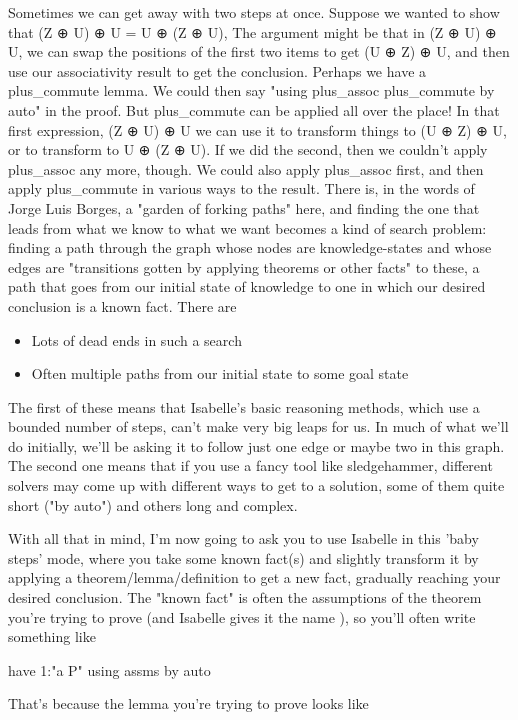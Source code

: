 Sometimes we can get away with two steps at once. Suppose we wanted to show that (Z ⊕ U) ⊕ U = U ⊕  (Z ⊕ U), The argument might be that in (Z ⊕ U) ⊕ U, we can swap the positions of the first two items to get (U ⊕ Z) ⊕ U, and then use our associativity result to get the conclusion. Perhaps we have a plus_commute lemma. We could then say "using plus_assoc plus_commute by auto" in the proof. But plus_commute can be applied all over the place! In that first expression, 
(Z ⊕ U) ⊕ U 
we can use it to transform things to (U ⊕ Z) ⊕ U, or to transform to U ⊕ (Z ⊕ U). If we did the second, then we couldn't apply plus_assoc any more, though. We could also apply plus_assoc first, and then apply plus_commute in various ways to the result. There is, in the words of Jorge Luis Borges, a "garden of forking paths" here, and finding the one that leads from what we know to what we want becomes a kind of search problem: finding a path through the graph whose nodes are knowledge-states and whose edges are "transitions gotten by applying theorems or other facts" to these, a path that goes from our initial state of knowledge to one in which our desired conclusion is a known fact. There are 
\begin{itemize}
    \item Lots of dead ends in such a search
\item Often multiple paths from our initial state to some goal state
\end{itemize}
The first of these means that Isabelle's basic reasoning methods, which use a bounded number of steps, can't make very big leaps for us. In much of what we'll do initially, we'll be asking it to follow just one edge or maybe two in this graph. The second one means that if you use a fancy tool like sledgehammer, different solvers may come up with different ways to get to a solution, some of them quite short ("by auto") and others long and complex. 

With all that in mind, I'm now going to ask you to use Isabelle in this 'baby steps' mode, where you take some known fact(s) and slightly transform it by applying a theorem/lemma/definition to get a new fact, gradually reaching your desired conclusion. The "known fact" is often the assumptions of the theorem you're trying to prove (and Isabelle gives it the name ), so you'll often write something like 

   have   1:"a \in P" using assms by auto 

That's because the lemma you're trying to prove looks like

